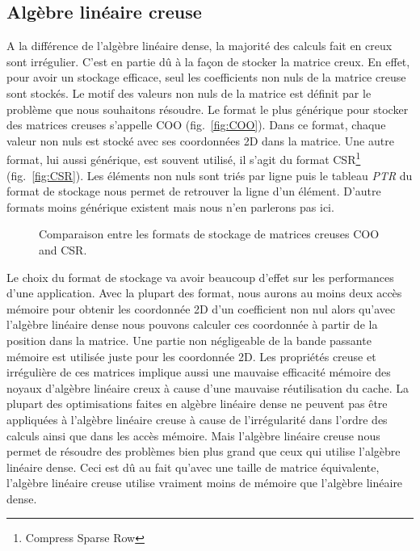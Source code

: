 \subsection{Algèbre linéaire creuse}
A la différence de l'algèbre linéaire dense, la majorité des calculs fait en creux sont irrégulier.
%
C'est en partie dû à la façon de stocker la matrice creux.
%
En effet, pour avoir un stockage efficace, seul les coefficients non nuls de la matrice creuse sont stockés.
%
Le motif des valeurs non nuls de la matrice est définit par le problème que nous souhaitons résoudre.
%
Le format le plus générique pour stocker des matrices creuses s'appelle COO (fig.~\ref{fig:COO}).
%
Dans ce format, chaque valeur non nuls est stocké avec ses coordonnées 2D dans la matrice.
%
Une autre format, lui aussi générique, est souvent utilisé, il s'agit du format CSR\footnote{Compress Sparse Row} (fig.~\ref{fig:CSR}).
%
Les éléments non nuls sont triés par ligne puis le tableau {\em PTR} du format de stockage nous permet de retrouver la ligne d'un élément.
%
D'autre formats moins générique existent mais nous n'en parlerons pas ici.

\begin{figure}[!ht]
     \begin{center}
    \end{center}
    \caption{Comparaison entre les formats de stockage de matrices creuses COO and CSR.}
    \label{fig:matrix_storage}
\end{figure}

Le choix du format de stockage va avoir beaucoup d'effet sur les performances d'une application.
%
Avec la plupart des format, nous aurons au moins deux accès mémoire pour obtenir les coordonnée 2D d'un coefficient non nul alors qu'avec l'algèbre linéaire dense nous pouvons calculer ces coordonnée à partir de la position dans la matrice.
%
Une partie non négligeable de la bande passante mémoire est utilisée juste pour les coordonnée 2D.
%
Les propriétés creuse et irrégulière de ces matrices implique aussi une mauvaise efficacité mémoire des noyaux d'algèbre linéaire creux à cause d'une mauvaise réutilisation du cache.
%
La plupart des optimisations faites en algèbre linéaire dense ne peuvent pas être appliquées à l'algèbre linéaire creuse à cause de l'irrégularité dans l'ordre des calculs ainsi que dans les accès mémoire.
%
Mais l'algèbre linéaire creuse nous permet de résoudre des problèmes bien plus grand que ceux qui utilise l'algèbre linéaire dense.
%
Ceci est dû au fait qu'avec une taille de matrice équivalente, l'algèbre linéaire creuse utilise vraiment moins de mémoire que l'algèbre linéaire dense.


